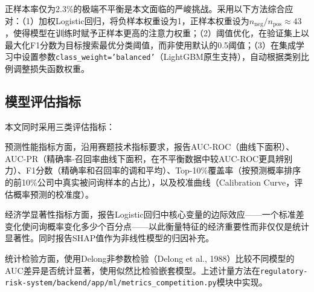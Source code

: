 正样本率仅为2.3\%的极端不平衡是本文面临的严峻挑战。采用以下方法综合应对：（1）加权Logistic回归，将负样本权重设为1，正样本权重设为$n_{\text{neg}}/n_{\text{pos}} \approx 43$，使得模型在训练时赋予正样本更高的注意力权重；（2）阈值优化，在验证集上以最大化F1分数为目标搜索最优分类阈值，而非使用默认的0.5阈值；（3）在集成学习中设置参数\texttt{class\_weight='balanced'}（LightGBM原生支持），自动根据类别比例调整损失函数权重。

\subsection{模型评估指标}

本文同时采用三类评估指标：

预测性能指标方面，沿用赛题技术指标要求，报告AUC-ROC（曲线下面积）、AUC-PR（精确率-召回率曲线下面积，在不平衡数据中较AUC-ROC更具辨别力）、F1分数（精确率和召回率的调和平均）、Top-10\%覆盖率（按预测概率排序的前10\%公司中真实被问询样本的占比），以及校准曲线（Calibration Curve，评估概率预测的校准度）。

经济学显著性指标方面，报告Logistic回归中核心变量的边际效应——一个标准差变化使问询概率变化多少个百分点——以此衡量特征的经济重要性而非仅仅是统计显著性。同时报告SHAP值作为非线性模型的归因补充。

统计检验方面，使用Delong非参数检验（Delong et al., 1988）比较不同模型的AUC差异是否统计显著，使用似然比检验嵌套模型。上述计量方法在\texttt{regulatory-risk-system/backend/app/ml/metrics\_competition.py}模块中实现。